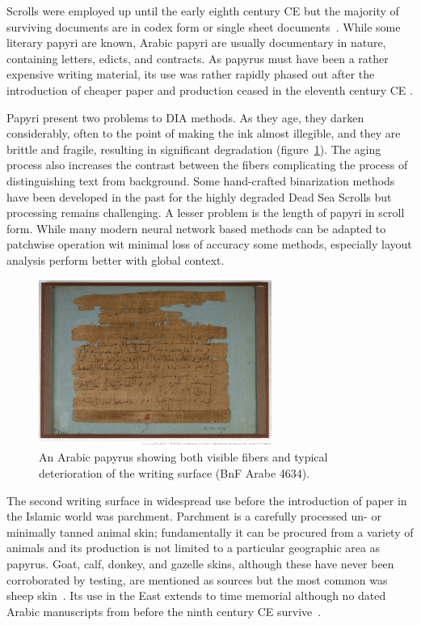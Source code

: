 Scrolls were employed up until the early eighth century CE but the majority of
surviving documents are in codex form or single sheet documents~\cite[pg.
30]{deroche2006islamic}. While some literary papyri are known, Arabic papyri
are usually documentary in nature, containing letters, edicts, and contracts.
As papyrus must have been a rather expensive writing material, its use was
rather rapidly phased out after the introduction of cheaper paper and
production ceased in the eleventh century CE \cite[pg.
193-194]{gacek2009arabic}. 

Papyri present two problems to DIA methods. As they age, they darken
considerably, often to the point of making the ink almost illegible, and they
are brittle and fragile, resulting in significant degradation
(figure~\ref{fig:papyrus}). The aging process also increases the contrast
between the fibers complicating the process of distinguishing text from
background. Some hand-crafted binarization methods have been developed in the
past for the highly degraded Dead Sea Scrolls \cite{dhali2017digital,
lavee2013computer} but processing remains challenging. A lesser problem is the
length of papyri in scroll form. While many modern neural network based methods
can be adapted to patchwise operation wit minimal loss of accuracy some
methods, especially layout analysis perform better with global context.

\begin{figure}
        \includegraphics[width=0.68\textwidth]{images/4644.jpg}
	\caption{An Arabic papyrus showing both visible fibers and typical
	deterioration of the writing surface (BnF Arabe 4634).}
        \label{fig:papyrus}
\end{figure}

The second writing surface in wide\-spread use before the introduction of paper
in the Islamic world was parchment. Parchment is a carefully processed un- or
minimally tanned animal skin; fundamentally it can be procured from a variety
of animals and its production is not limited to a particular geographic area as
papyrus. Goat, calf, donkey, and gazelle skins, although these have never been
corroborated by testing, are mentioned as sources but the most common was sheep
skin~\cite[pg. 44]{blair2006islamic}. Its use in the East extends to time
memorial although no dated Arabic manuscripts from before the ninth century CE
survive~\cite[pg.33]{deroche2006islamic}. 

